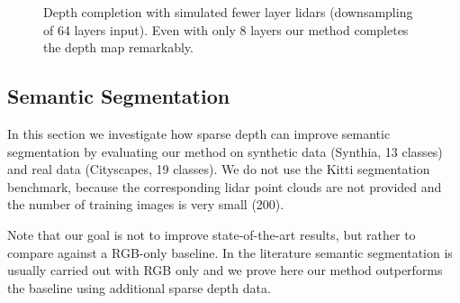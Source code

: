 \documentclass[10pt,twocolumn,letterpaper]{article}
\begin{document}
\begin{figure}
	\centering
	\scriptsize
{}


	\caption{Depth completion with simulated fewer layer lidars (downsampling of 64 layers input). Even with only 8 layers our method completes the depth map remarkably.}
	\label{fig:lidarAblation}
\end{figure}

\subsection{Semantic Segmentation}
\label{sec:semanticSegmentation}
In this section we investigate how sparse depth can improve semantic segmentation by evaluating our method on synthetic data (Synthia, 13 classes) and real data (Cityscapes, 19 classes). We do not use the Kitti segmentation benchmark, because the corresponding lidar point clouds are not provided and the number of training images is very small (200).

Note that our goal is not to improve state-of-the-art results, but rather to compare against a RGB-only baseline. In the literature semantic segmentation is usually carried out with RGB only and we prove here our method outperforms the baseline using additional sparse depth data.
\end{document}
